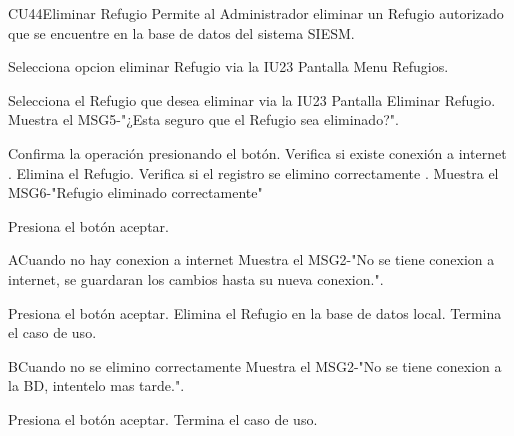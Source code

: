 \begin{UseCase}{CU44}{Eliminar Refugio}{
		Permite al Administrador eliminar un Refugio autorizado que se encuentre en la base de datos del sistema SIESM.\\
}
	
\end{UseCase}



\begin{UCtrayectoria}
	\item\UCactor Selecciona opcion eliminar Refugio via la IU23 Pantalla Menu Refugios.
	\item\UCactor Selecciona el Refugio que desea eliminar via la IU23 Pantalla Eliminar Refugio.
	\UCpaso Muestra el MSG5-"¿Esta seguro que el Refugio sea eliminado?".
	\item\UCactor Confirma la operación presionando el botón.
	\UCpaso Verifica si existe conexión a internet .
	\UCpaso Elimina el Refugio.
	\UCpaso Verifica si el registro se elimino correctamente .
	\UCpaso Muestra el MSG6-"Refugio eliminado correctamente"
	\item\UCactor Presiona el botón aceptar.
\end{UCtrayectoria}


\begin{UCtrayectoriaA}{A}{Cuando no hay conexion a internet}
	\UCpaso Muestra el MSG2-"No se tiene conexion a internet, se guardaran los cambios hasta su nueva conexion.".
	\item\UCactor Presiona el botón aceptar.
	\UCpaso Elimina el Refugio en la base de datos local.	
	\UCpaso[] Termina el caso de uso.
\end{UCtrayectoriaA}

\begin{UCtrayectoriaA}{B}{Cuando no se elimino correctamente}
	\UCpaso Muestra el MSG2-"No se tiene conexion a la BD, intentelo mas tarde.".
	\item\UCactor Presiona el botón aceptar.
	\UCpaso[] Termina el caso de uso.
\end{UCtrayectoriaA}